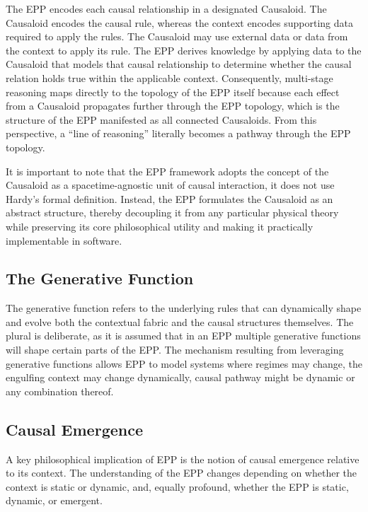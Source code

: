 The EPP encodes each causal relationship in a designated Causaloid. The Causaloid encodes the causal rule, whereas the context encodes supporting data required to apply the rules. The Causaloid may use external data or data from the context to apply its rule. 
The EPP derives knowledge by applying data to the Causaloid that models that causal relationship to determine
whether the causal relation holds true within the applicable context. Consequently, multi-stage reasoning maps directly
to the topology of the EPP itself because each effect from a Causaloid propagates further through the EPP topology,
which is the structure of the EPP manifested as all connected Causaloids. From this perspective, a “line of reasoning”
literally becomes a pathway through the EPP topology.

It is important to note that the EPP framework adopts the concept of the Causaloid as a spacetime-agnostic unit of causal interaction,  it does not use Hardy's formal definition. Instead, the EPP formulates the Causaloid as an abstract structure, thereby decoupling it from any particular physical theory while preserving its core philosophical utility and making it practically implementable in software.    
\subsection{The Generative Function}
\label{ssec:recap_generative_function}

The generative function refers to the underlying rules that can dynamically shape and evolve both the contextual fabric and the causal structures themselves. The plural is deliberate, as it is assumed that in an EPP multiple generative functions will shape certain parts
of the EPP. The mechanism resulting from leveraging generative functions allows EPP to model systems where regimes may change, the engulfing context may change dynamically, causal pathway might be dynamic or any combination thereof. 
    
\subsection{Causal Emergence}           
\label{ssec:recap_emergence}

 A key philosophical implication of EPP is the notion of causal emergence relative to its context.  The understanding of the EPP changes depending on whether the context is static or dynamic, and, equally profound, whether the EPP is static, dynamic, or emergent.

